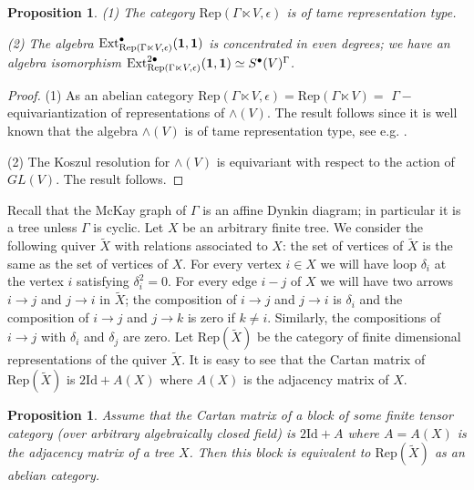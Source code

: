 \documentclass{amsart}
\newtheorem{proposition}[theorem]{Proposition}
\theoremstyle{definition}
\newcommand{\Rep}{\text{Rep}}
\newcommand{\Id}{\text{Id}}
\newcommand{\Ext}{\text{Ext}}
\newcommand{\be}{{\bf 1}}
\numberwithin{equation}{section}
\begin{document}
\begin{proposition}\label{3.1}
(1) The category $\Rep(\Gamma \ltimes V, \epsilon)$ is of tame representation type.

(2) The algebra $\Ext_{\Rep(\Gamma \ltimes V, \epsilon)}^\bullet (\be,\be)$ is concentrated in even degrees; we have an algebra isomorphism $\Ext_{\Rep(\Gamma \ltimes V, \epsilon)}^{2\bullet} (\be,\be)\simeq S^\bullet(V)^\Gamma$.
\end{proposition} 

\begin{proof} (1) As an abelian category $\Rep(\Gamma \ltimes V, \epsilon)=\Rep(\Gamma \ltimes V)=$
$\Gamma-$equivariantization of representations of $\wedge(V)$. The result follows since it is well
known that the algebra $\wedge(V)$ is of tame representation type, see e.g. \cite{Ri}.

(2) The Koszul resolution for $\wedge(V)$ is equivariant with respect to the action of $GL(V)$. The result
follows.
\end{proof}

Recall that the McKay graph of $\Gamma$ is an affine Dynkin diagram; in particular it is a tree unless
$\Gamma$ is cyclic. Let $X$ be an arbitrary finite tree. We consider the following quiver $\tilde X$ with relations
associated to $X$: the set of vertices of $\tilde X$ is the same as the set of vertices of $X$. For every vertex $i\in X$ we will have loop $\delta_i$ at the vertex $i$ satisfying $\delta_i^2=0$. For every edge $i-j$ of $X$
we will have two arrows $i\to j$ and $j\to i$ in $\tilde X$; the composition of $i\to j$ and 
$j\to i$ is $\delta_i$ and the composition of $i\to j$ and $j\to k$ is zero if $k\ne i$. 
Similarly, the compositions of $i\to j$ with $\delta_i$ and $\delta_j$ are zero. Let $\Rep(\tilde X)$
be the category of finite dimensional representations of the quiver $\tilde X$. It is easy to see
that the Cartan matrix of $\Rep(\tilde X)$ is $2\Id +A(X)$ where $A(X)$ is the adjacency matrix of $X$. 

\begin{proposition}\label{tree}
Assume that the Cartan matrix of a block of some finite tensor category (over arbitrary 
algebraically closed field) is $2\Id+A$ where $A=A(X)$ is the adjacency matrix of a tree $X$. Then
this block is equivalent to $\Rep(\tilde X)$ as an abelian category.
\end{proposition}
\end{document}
